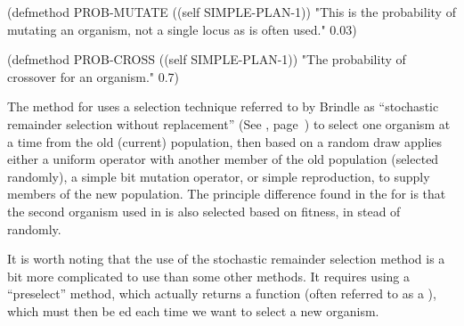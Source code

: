 {\begin{clcode}
(defmethod PROB-MUTATE ((self SIMPLE-PLAN-1))
  {\sf "This is the probability of mutating an organism, not a single locus as is often used."}
  0.03)

(defmethod PROB-CROSS ((self SIMPLE-PLAN-1))
  {\sf "The probability of crossover for an organism."}
  0.7)\end{clcode}

\filbreak

The method  for  uses a
selection technique referred to by Brindle \cite{ga:brindle,ga:goldberg} as ``stochastic
remainder selection without replacement''
(See ,
page~\pageref{population:stochastic-remainder-preselect}) to select one organism at a
time from the old (current) population, then based on a random draw applies either a
uniform  operator
\cite{ga:uniform-xover,ga:parameterized-uniform-xover,ga:davis-handbook} with another
member of the old population (selected randomly), a simple bit mutation
operator, or simple reproduction, to supply members of the new population. The
principle difference found in the  for
 is that the second organism used in  is also
selected based on fitness, in stead of randomly.

It is worth noting that the use of the stochastic
remainder selection method is a bit more complicated to use than some other methods.
It requires using a ``preselect'' method, which actually returns a function (often referred
to as a ), which must
then be ed each time we want to select a new organism.

}
